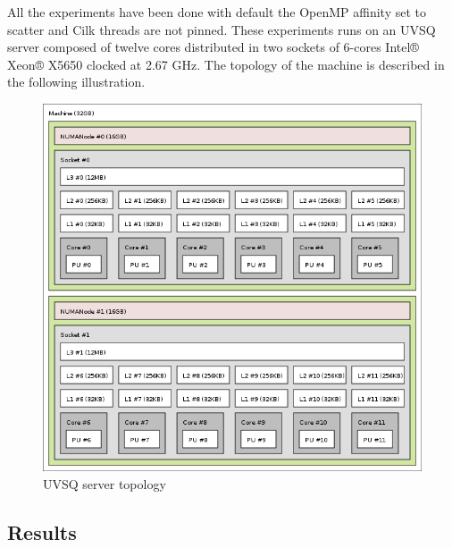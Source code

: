 \documentclass{IOS-Book-Article}
\begin{document}
All the experiments have been done with default the OpenMP affinity set to scatter and Cilk threads are not pinned. These experiments runs on an UVSQ server
composed of twelve cores distributed in two sockets of 6-cores Intel® Xeon® X5650 clocked at 2.67 GHz. The topology of the machine is described in the following illustration.
\begin{figure}[htp]
 \centering
 \label{fig5}
 \includegraphics[scale=0.35]{topo_mauduit.png}
 \caption{UVSQ server topology}
\end{figure}

\subsection{Results}
\end{document}
